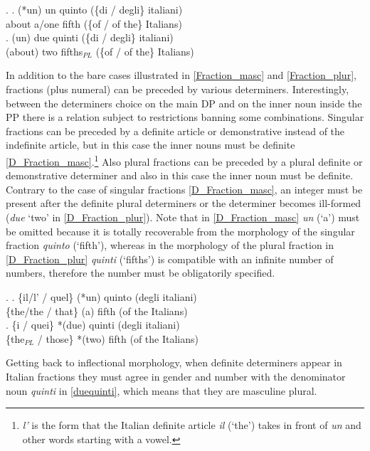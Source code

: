 \documentclass[charis, linguex]{glossa}
\begin{document}
\ex. \ag. (*un) un quinto (\{di / degli\}  italiani)  \\
      about a/one fifth (\{of / {of the}\} Italians) \\ \label{Fraction_masc}
  \bg. (un) due quinti (\{di / degli\} italiani) \\
      (about) two fifths$_{PL}$ (\{of / {of the}\} Italians) \\ \label{Fraction_plur}
	  
	   
In addition to the bare cases illustrated in \ref{Fraction_masc} and \ref{Fraction_plur}, fractions (plus numeral) can be preceded by various determiners.  Interestingly, between the determiners choice on the main DP and on the inner noun inside the PP there is a relation subject to restrictions banning some combinations. Singular fractions can be preceded by a definite article or demonstrative instead of the indefinite article, but in this case the inner nouns must be definite \ref{D_Fraction_masc}.\footnote{\textit{l'} is the form that the Italian definite article \textit{il} (`the') takes in front of \textit{un}  and other words starting with a vowel.} Also plural fractions can be preceded by a plural definite or demonstrative determiner and also in this case the inner noun must be definite. Contrary to the case of singular fractions \ref{D_Fraction_masc}, an integer must be present after the definite plural determiners or the determiner becomes ill-formed (\textit{due} `two' in \ref{D_Fraction_plur}). Note that in \ref{D_Fraction_masc} \textit{un} (`a') must be omitted because it is totally recoverable from the morphology of the singular fraction \textit{quinto} (`fifth'), whereas in the morphology of the plural fraction in \ref{D_Fraction_plur} \textit{quinti} (`fifths') is compatible with an infinite number of numbers, therefore the number must be obligatorily specified. 

\ex. \ag. \{il/l' / quel\} (*un) quinto (degli  italiani)   \\
      \{the/the / that\} (a) fifth ({of the} Italians)  \\ \label{D_Fraction_masc}
	 \bg. \{i / quei\} *(due) quinti (degli  italiani)   \\
      \{the$_{PL}$ / those\} *(two) fifth ({of the} Italians)  \\ \label{D_Fraction_plur}
	  

Getting back to inflectional morphology, when definite determiners appear in Italian fractions they must agree in gender and number with the denominator noun \textit{quinti} in \ref{duequinti}, which means that they are masculine plural.
\end{document}
